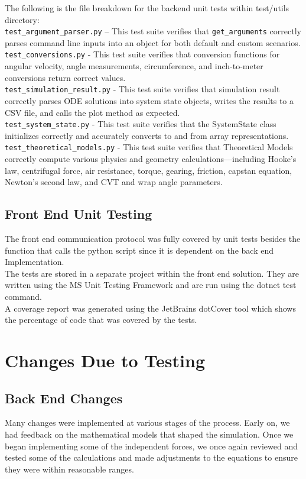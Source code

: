 \documentclass[12pt, titlepage]{article}
\begin{document}
\noindent The following is the file breakdown for the backend unit tests within test/utils directory:
\\
\texttt{test\_argument\_parser.py} -- This test suite verifies that \texttt{get\_arguments} correctly parses command line inputs into an object for both default and custom scenarios.
\\
\texttt{test\_conversions.py} - This test suite verifies that conversion functions for angular velocity, angle measurements, circumference, and inch-to-meter conversions return correct values.
\\
\texttt{test\_simulation\_result.py} - This test suite verifies that simulation result correctly parses ODE solutions into system state objects, writes the results to a CSV file, and calls the plot method as expected.
\\
\texttt{test\_system\_state.py} - This test suite verifies that the SystemState class initializes correctly and accurately converts to and from array representations.
\\
\texttt{test\_theoretical\_models.py} - This test suite verifies that Theoretical Models correctly compute various physics and geometry calculations—including Hooke's law, centrifugal force, air resistance, torque, gearing, friction, capstan equation, Newton's second law, and CVT and wrap angle parameters.

\subsection{Front End Unit Testing}
The front end communication protocol was fully covered by unit tests besides the function that calls the python script since it is dependent on the back end Implementation.
\\
The tests are stored in a separate project within the front end solution. They are written using the MS Unit Testing Framework and are run using the dotnet test command.
\\
A coverage report was generated using the JetBrains dotCover tool which shows the percentage of code that was covered by the tests.  

\section{Changes Due to Testing}

\subsection{Back End Changes}
Many changes were implemented at various stages of the process. Early on, we had feedback on the mathematical models that shaped the simulation. Once we began implementing some of the independent forces, we once again reviewed and tested some of the calculations and made adjustments to the equations to ensure they were within reasonable ranges. \\
\end{document}
